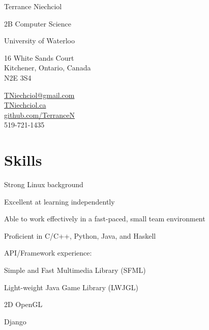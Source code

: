 \documentclass[10pt,letterpaper]{article}
\begin{document}
\begin{center}
{\Huge Terrance Niechciol}

2B Computer Science

University of Waterloo
\end{center}

\begin{minipage}[t]{0.5\textwidth}
\begin{center}
16 White Sands Court\\
Kitchener, Ontario, Canada\\
N2E 3S4\\
\end{center}
\end{minipage} %
\begin{minipage}[t]{0.5\textwidth}
\begin{center}
\href{mailto:TNiechciol@gmail.com}{TNiechciol@gmail.com}\\
\href{http://TNiechciol.ca}{TNiechciol.ca}\\
\href{https://github.com/TerranceN}{github.com/TerranceN}\\
519-721-1435\\
\end{center}
\end{minipage}

\section*{Skills}
    \begin{description}
        \item Strong Linux background
        \item Excellent at learning independently
        \item Able to work effectively in a fast-paced, small team environment
        \item Proficient in C/C++, Python, Java, and Haskell
        \item API/Framework experience:
        \begin{description}
            \item Simple and Fast Multimedia Library (SFML)
            \item Light-weight Java Game Library (LWJGL)
            \item 2D OpenGL
            \item Django
        \end{description}
    \end{description}
\end{document}
